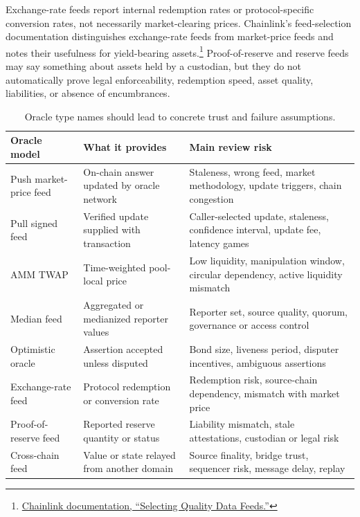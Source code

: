 Exchange-rate feeds report internal redemption rates or protocol-specific conversion rates, not necessarily market-clearing prices. Chainlink's feed-selection documentation distinguishes exchange-rate feeds from market-price feeds and notes their usefulness for yield-bearing assets.\footnote{\href{https://docs.chain.link/data-feeds/selecting-data-feeds}{Chainlink documentation, ``Selecting Quality Data Feeds.''}} Proof-of-reserve and reserve feeds may say something about assets held by a custodian, but they do not automatically prove legal enforceability, redemption speed, asset quality, liabilities, or absence of encumbrances.

\begin{table}[htbp]
\centering
\small
\renewcommand{\arraystretch}{1.16}
\begin{tabularx}{\textwidth}{@{}>{\RaggedRight\arraybackslash}p{}>{\RaggedRight\arraybackslash}p{}X@{}}
\toprule
Oracle model & What it provides & Main review risk \\
\midrule
Push market-price feed & On-chain answer updated by oracle network & Staleness, wrong feed, market methodology, update triggers, chain congestion \\
Pull signed feed & Verified update supplied with transaction & Caller-selected update, staleness, confidence interval, update fee, latency games \\
AMM TWAP & Time-weighted pool-local price & Low liquidity, manipulation window, circular dependency, active liquidity mismatch \\
Median feed & Aggregated or medianized reporter values & Reporter set, source quality, quorum, governance or access control \\
Optimistic oracle & Assertion accepted unless disputed & Bond size, liveness period, disputer incentives, ambiguous assertions \\
Exchange-rate feed & Protocol redemption or conversion rate & Redemption risk, source-chain dependency, mismatch with market price \\
Proof-of-reserve feed & Reported reserve quantity or status & Liability mismatch, stale attestations, custodian or legal risk \\
Cross-chain feed & Value or state relayed from another domain & Source finality, bridge trust, sequencer risk, message delay, replay \\
\bottomrule
\end{tabularx}
\caption{Oracle type names should lead to concrete trust and failure assumptions.}
\end{table}

